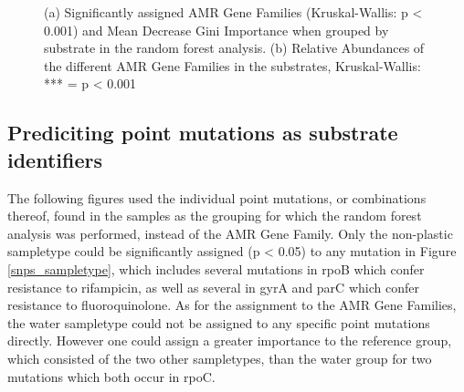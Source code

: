 \begin{figure}[!h]
    \centering
    \caption{(a) Significantly assigned AMR Gene Families (Kruskal-Wallis: p < 0.001) and Mean Decrease Gini Importance when grouped by substrate in the random forest analysis. (b) Relative Abundances of the different AMR Gene Families in the substrates, Kruskal-Wallis: *** = p < 0.001}
    \label{amr_substrate}
\end{figure}

\newpage
\subsection{Prediciting point mutations as substrate identifiers}
The following figures used the individual point mutations, or combinations thereof, found in the samples as the grouping for which the random forest analysis was performed, instead of the AMR Gene Family. 
Only the non-plastic sampletype could be significantly assigned (p < 0.05) to any mutation in Figure \ref{snps_sampletype}, which includes several mutations in rpoB which confer resistance to rifampicin, as well as several in gyrA and parC which confer resistance to fluoroquinolone. 
As for the assignment to the AMR Gene Families, the water sampletype could not be assigned to any specific point mutations directly. However one could assign a greater importance to the reference group, which consisted of the two other sampletypes, than the water group for two mutations which both occur in rpoC.

